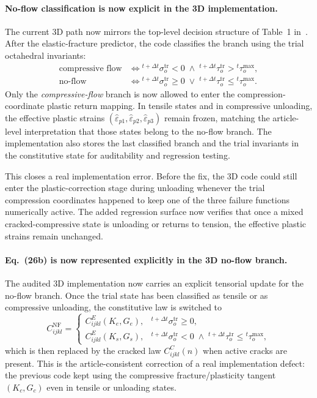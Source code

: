 \paragraph{No-flow classification is now explicit in the 3D implementation.}
The current 3D path now mirrors the top-level decision structure of
Table~1 in~\cite{KoBathe2026}.  After the elastic-fracture predictor, the code
classifies the branch using the trial octahedral invariants:
\begin{align}
  \text{compressive flow}
  &\iff
  {}^{t+\Delta t}\sigma_o^{\mathrm{tr}} < 0
  \;\wedge\;
  {}^{t+\Delta t}\tau_o^{\mathrm{tr}} > {}^{t}\tau_o^{\max},
  \label{eq:kb-3d-flow-classification}
  \\
  \text{no-flow}
  &\iff
  {}^{t+\Delta t}\sigma_o^{\mathrm{tr}} \ge 0
  \;\vee\;
  {}^{t+\Delta t}\tau_o^{\mathrm{tr}} \le {}^{t}\tau_o^{\max}.
  \label{eq:kb-3d-no-flow-classification}
\end{align}
Only the \emph{compressive-flow} branch is now allowed to enter the
compression-coordinate plastic return mapping.  In tensile states and in
compressive unloading, the effective plastic strains
\((\hat\varepsilon_{p1},\hat\varepsilon_{p2},\hat\varepsilon_{p3})\) remain
frozen, matching the article-level interpretation that those states belong to
the no-flow branch.  The implementation also stores the last classified branch
and the trial invariants in the constitutive state for auditability and
regression testing.

This closes a real implementation error.  Before the fix, the 3D code could
still enter the plastic-correction stage during unloading whenever the trial
compression coordinates happened to keep one of the three failure functions
numerically active.  The added regression surface now verifies that once a
mixed cracked-compressive state is unloading or returns to tension, the
effective plastic strains remain unchanged.

\paragraph{Eq.~(26b) is now represented explicitly in the 3D no-flow branch.}
The audited 3D implementation now carries an explicit tensorial update for the
no-flow branch.  Once the trial state has been classified as tensile or as
compressive unloading, the constitutive law is switched to
\begin{equation}
  C_{ijkl}^{\mathrm{NF}}
  =
  \begin{cases}
    C_{ijkl}^{E}(K_e,G_e),
      & {}^{t+\Delta t}\sigma_o^{\mathrm{tr}} \ge 0, \\
    C_{ijkl}^{E}(K_s,G_s),
      & {}^{t+\Delta t}\sigma_o^{\mathrm{tr}} < 0
        \;\wedge\;
        {}^{t+\Delta t}\tau_o^{\mathrm{tr}} \le {}^{t}\tau_o^{\max},
  \end{cases}
  \label{eq:kb-3d-no-flow-ce}
\end{equation}
which is then replaced by the cracked law \(C_{ijkl}^{C}(n)\) when active
cracks are present.  This is the article-consistent correction of a real
implementation defect: the previous code kept using the compressive
fracture/plasticity tangent \((K_c,G_c)\) even in tensile or unloading states.

